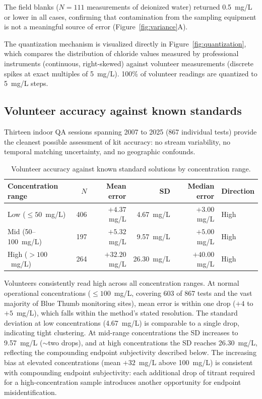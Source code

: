 \documentclass[lineno]{wlpeerj}
\begin{document}
The field blanks ($N=111$ measurements of deionized water) returned 0.5~mg/L or lower in all cases, confirming that contamination from the sampling equipment is not a meaningful source of error (Figure~\ref{fig:variance}A).

The quantization mechanism is visualized directly in Figure~\ref{fig:quantization}, which compares the distribution of chloride values measured by professional instruments (continuous, right-skewed) against volunteer measurements (discrete spikes at exact multiples of 5~mg/L). 100\% of volunteer readings are quantized to 5~mg/L steps.

\subsection{Volunteer accuracy against known standards}

Thirteen indoor QA sessions spanning 2007 to 2025 (867 individual tests) provide the cleanest possible assessment of kit accuracy: no stream variability, no temporal matching uncertainty, and no geographic confounds.

\begin{table}[ht]
\centering
\caption{Volunteer accuracy against known standard solutions by concentration range.}
\label{tab:accuracy}
\begin{tabular}{l r r r r l}
\toprule
Concentration range & $N$ & Mean error & SD & Median error & Direction \\
\midrule
Low ($\leq 50$~mg/L) & 406 & $+4.37$~mg/L & 4.67~mg/L & $+3.00$~mg/L & High \\
Mid (50--100~mg/L) & 197 & $+5.32$~mg/L & 9.57~mg/L & $+5.00$~mg/L & High \\
High ($> 100$~mg/L) & 264 & $+32.20$~mg/L & 26.30~mg/L & $+40.00$~mg/L & High \\
\bottomrule
\end{tabular}
\end{table}

Volunteers consistently read high across all concentration ranges. At normal operational concentrations ($\leq 100$~mg/L, covering 603 of 867 tests and the vast majority of Blue Thumb monitoring sites), mean error is within one drop ($+4$ to $+5$~mg/L), which falls within the method's stated resolution. The standard deviation at low concentrations (4.67~mg/L) is comparable to a single drop, indicating tight clustering. At mid-range concentrations the SD increases to 9.57~mg/L ($\sim$two drops), and at high concentrations the SD reaches 26.30~mg/L, reflecting the compounding endpoint subjectivity described below. The increasing bias at elevated concentrations (mean $+32$~mg/L above 100~mg/L) is consistent with compounding endpoint subjectivity: each additional drop of titrant required for a high-concentration sample introduces another opportunity for endpoint misidentification.
\end{document}
